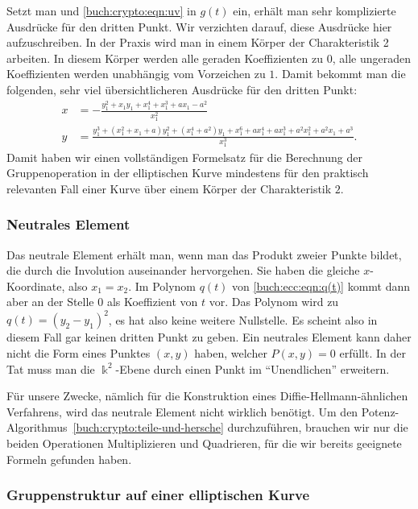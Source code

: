 Setzt man
\label{buch:crypto:eqn:t}
und
\eqref{buch:crypto:eqn:uv}
in $g(t)$ ein, erhält man sehr komplizierte Ausdrücke für den dritten Punkt.
Wir verzichten darauf, diese Ausdrücke hier aufzuschreiben.
In der Praxis wird man in einem Körper der Charakteristik 2 arbeiten.
In diesem Körper werden alle geraden Koeffizienten zu $0$, alle ungeraden
Koeffizienten werden unabhängig vom Vorzeichen zu $1$.
Damit bekommt man die folgenden, sehr viel übersichtlicheren Ausdrücke
für den dritten Punkt:
\begin{equation}
\begin{aligned}
x
&=
-\frac{
y_1^2+x_1y_1+x_1^4+x_1^3+ax_1-a^2
 }{
x_1^2
}
\\
y
&=
\frac{
y_1^3+(x_1^2+x_1+a)y_1^2+(x_1^4 +a^2)y_1+x_1^6+ax_1^4+ax_1^3+a^2x_1^2+a^2x_1+a^3
}{
 x_1^3
}.
\end{aligned}
\label{buch:crypto:eqn:tangentechar2}
\end{equation}
Damit haben wir einen vollständigen Formelsatz für die Berechnung der
Gruppenoperation in der elliptischen Kurve mindestens für den praktisch
relevanten Fall einer Kurve über einem Körper der Charakteristik $2$.

\subsubsection{Neutrales Element}
Das neutrale Element erhält man, wenn man das Produkt zweier Punkte
bildet, die durch die Involution auseinander hervorgehen.
Sie haben die gleiche $x$-Koordinate, also $x_1=x_2$.
Im Polynom $q(t)$ von \eqref{buch:ecc:eqn:q(t)} kommt dann aber an
der Stelle $0$ als Koeffizient von $t$ vor.
Das Polynom wird zu $q(t) = (y_2-y_1)^2$, es hat also keine weitere
Nullstelle.
Es scheint also in diesem Fall gar keinen dritten Punkt zu geben.
Ein neutrales Element kann daher nicht die Form eines Punktes $(x,y)$
haben, welcher $P(x,y)=0$ erfüllt.
In der Tat muss man die $\Bbbk^2$-Ebene durch einen Punkt im ``Unendlichen''
erweitern.

Für unsere Zwecke, nämlich für die Konstruktion eines
Diffie-Hellmann-ähnlichen Verfahrens, wird das neutrale Element
nicht wirklich benötigt.
Um den Potenz-Algorithmus~\ref{buch:crypto:teile-und-hersche}
durchzuführen, brauchen wir nur die beiden Operationen
Multiplizieren und Quadrieren, für die wir bereits
geeignete Formeln gefunden haben.

\subsubsection{Gruppenstruktur auf einer elliptischen Kurve}

